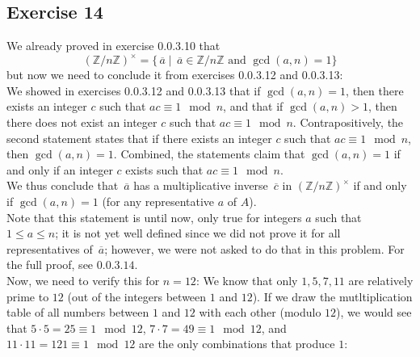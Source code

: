 \documentclass[12pt]{article}
\newcommand{\Z}{\mathbb{Z}}
\newcommand{\olsi}[1]{\,\overline{{#1}}}
\begin{document}
    \subsection*{Exercise 14}
    We already proved in exercise 0.0.3.10 that
    \[ (\Z/n\Z)^\times = \{ \olsi{a} \mid \olsi{a} \in \Z/n\Z
    \text{ and } \gcd(a, n) = 1 \} \]
    but now we need to conclude it
    from exercises 0.0.3.12 and 0.0.3.13: \\
    We showed in exercises 0.0.3.12 and 0.0.3.13
    that if $\gcd(a, n) = 1$,
    then there exists an integer $c$ such that $ac \equiv 1 \mod n$,
    and that if $\gcd(a, n) > 1$,
    then there does not exist
    an integer $c$ such that $ac \equiv 1 \mod n$.
    Contrapositively,
    the second statement states that
    if there exists an integer $c$ such that $ac \equiv 1 \mod n$,
    then $\gcd(a, n) = 1$.
    Combined, the statements claim that
    $\gcd(a, n) = 1$ if and only if an integer $c$ exists
    such that $ac \equiv 1 \mod n$. \\
    We thus conclude that $\olsi{a}$
    has a multiplicative inverse $\olsi{c}$ in $(\Z/n\Z)^\times$ 
    if and only if $\gcd(a, n) = 1$
    (for any representative $a$ of $A$). \\
    Note that this statement is until now, only true for 
    integers $a$ such that $1 \leqslant a \leqslant n$;
    it is not yet well defined since we did not prove it
    for all representatives of $\olsi{a}$;
    however, we were not asked to do that in this problem.
    For the full proof, see $0.0.3.14$. \\
    Now, we need to verify this for $n = 12$:
    We know that only $1, 5, 7, 11$ are relatively prime to $12$
    (out of the integers between $1$ and $12$).
    If we draw the mutltiplication table of all numbers
    between $1$ and $12$ with each other (modulo $12$),
    we would see that $5 \cdot 5 = 25 \equiv 1 \mod 12$,
    $7 \cdot 7 = 49 \equiv 1 \mod 12$,
    and $11 \cdot 11 = 121 \equiv 1 \mod 12$
    are the only combinations that produce $1$:
\end{document}
